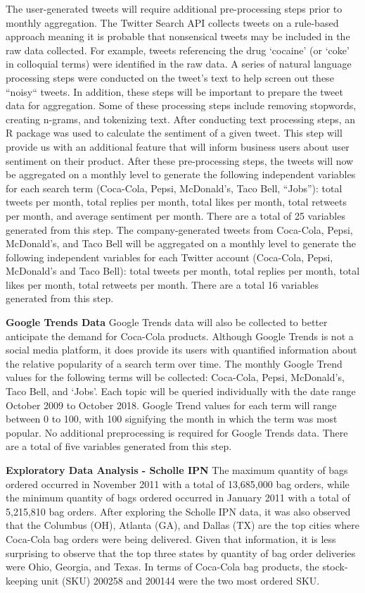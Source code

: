 \documentclass[12pt,oneside]{chicagocapstone}
\begin{document}
The user-generated tweets will require additional pre-processing steps prior to monthly aggregation. The Twitter Search API collects tweets on a rule-based approach meaning it is probable that nonsensical tweets may be included in the raw data collected. For example, tweets referencing the drug `cocaine' (or `coke' in colloquial terms) were identified in the raw data. A series of natural language processing steps were conducted on the tweet's text to help screen out these ``noisy`` tweets. In addition, these steps will be important to prepare the tweet data for aggregation. Some of these processing steps include removing stopwords, creating n-grams, and tokenizing text. After conducting text processing steps, an R package was used to calculate the sentiment of a given tweet. This step will provide us with an additional feature that will inform business users about user sentiment on their product. After these pre-processing steps, the tweets will now be aggregated on a monthly level to generate the following independent variables for each search term (Coca-Cola, Pepsi, McDonald's, Taco Bell, ``Jobs''): total tweets per month, total replies per month, total likes per month, total retweets per month, and average sentiment per month. There are a total of 25 variables generated from this step.
The company-generated tweets from Coca-Cola, Pepsi, McDonald's, and Taco Bell will be aggregated on a monthly level to generate the following independent variables for each Twitter account (Coca-Cola, Pepsi, McDonald's and Taco Bell): total tweets per month, total replies per month, total likes per month, total retweets per month. There are a total 16 variables generated from this step.

\textbf{Google Trends Data}
Google Trends data will also be collected to better anticipate the demand for Coca-Cola products. Although Google Trends is not a social media platform, it does provide its users with quantified information about the relative popularity of a search term over time. The monthly Google Trend values for the following terms will be collected: Coca-Cola, Pepsi, McDonald's, Taco Bell, and `Jobs'. Each topic will be queried individually with the date range October 2009 to October 2018. Google Trend values for each term will range between 0 to 100, with 100 signifying the month in which the term was most popular. No additional preprocessing is required for Google Trends data. There are a total of five variables generated from this step.

\textbf{Exploratory Data Analysis - Scholle IPN}
The maximum quantity of bags ordered occurred in November 2011 with a total of 13,685,000 bag orders, while the minimum quantity of bags ordered occurred in January 2011 with a total of 5,215,810 bag orders. After exploring the Scholle IPN data, it was also observed that the Columbus (OH), Atlanta (GA), and Dallas (TX) are the top cities where Coca-Cola bag orders were being delivered. Given that information, it is less surprising to observe that the top three states by quantity of bag order deliveries were Ohio, Georgia, and Texas. In terms of Coca-Cola bag products, the stock-keeping unit (SKU) 200258 and 200144 were the two most ordered SKU.
\end{document}
